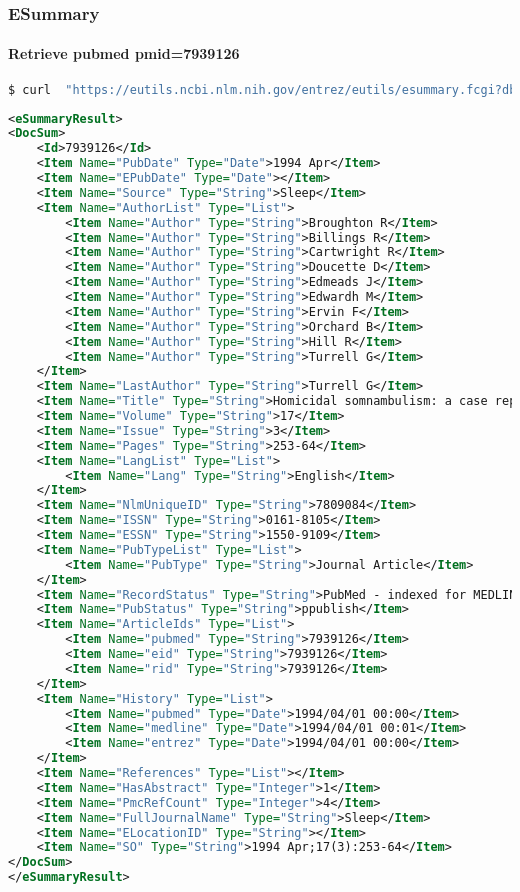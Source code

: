 \documentclass{beamer}
\begin{document}
\begin{frame}[fragile]
\frametitle{ESummary}
\framesubtitle{Retrieve pubmed pmid=7939126}
\begin{lstlisting}[language=bash,basicstyle=\tiny,breaklines=true]
$ curl  "https://eutils.ncbi.nlm.nih.gov/entrez/eutils/esummary.fcgi?db=pubmed&id=7939126"
\end{lstlisting}

\begin{lstlisting}[language=xml,basicstyle=\tiny,breaklines=false]
<eSummaryResult>
<DocSum>
	<Id>7939126</Id>
	<Item Name="PubDate" Type="Date">1994 Apr</Item>
	<Item Name="EPubDate" Type="Date"></Item>
	<Item Name="Source" Type="String">Sleep</Item>
	<Item Name="AuthorList" Type="List">
		<Item Name="Author" Type="String">Broughton R</Item>
		<Item Name="Author" Type="String">Billings R</Item>
		<Item Name="Author" Type="String">Cartwright R</Item>
		<Item Name="Author" Type="String">Doucette D</Item>
		<Item Name="Author" Type="String">Edmeads J</Item>
		<Item Name="Author" Type="String">Edwardh M</Item>
		<Item Name="Author" Type="String">Ervin F</Item>
		<Item Name="Author" Type="String">Orchard B</Item>
		<Item Name="Author" Type="String">Hill R</Item>
		<Item Name="Author" Type="String">Turrell G</Item>
	</Item>
	<Item Name="LastAuthor" Type="String">Turrell G</Item>
	<Item Name="Title" Type="String">Homicidal somnambulism: a case report.</Item>
	<Item Name="Volume" Type="String">17</Item>
	<Item Name="Issue" Type="String">3</Item>
	<Item Name="Pages" Type="String">253-64</Item>
	<Item Name="LangList" Type="List">
		<Item Name="Lang" Type="String">English</Item>
	</Item>
	<Item Name="NlmUniqueID" Type="String">7809084</Item>
	<Item Name="ISSN" Type="String">0161-8105</Item>
	<Item Name="ESSN" Type="String">1550-9109</Item>
	<Item Name="PubTypeList" Type="List">
		<Item Name="PubType" Type="String">Journal Article</Item>
	</Item>
	<Item Name="RecordStatus" Type="String">PubMed - indexed for MEDLINE</Item>
	<Item Name="PubStatus" Type="String">ppublish</Item>
	<Item Name="ArticleIds" Type="List">
		<Item Name="pubmed" Type="String">7939126</Item>
		<Item Name="eid" Type="String">7939126</Item>
		<Item Name="rid" Type="String">7939126</Item>
	</Item>
	<Item Name="History" Type="List">
		<Item Name="pubmed" Type="Date">1994/04/01 00:00</Item>
		<Item Name="medline" Type="Date">1994/04/01 00:01</Item>
		<Item Name="entrez" Type="Date">1994/04/01 00:00</Item>
	</Item>
	<Item Name="References" Type="List"></Item>
	<Item Name="HasAbstract" Type="Integer">1</Item>
	<Item Name="PmcRefCount" Type="Integer">4</Item>
	<Item Name="FullJournalName" Type="String">Sleep</Item>
	<Item Name="ELocationID" Type="String"></Item>
	<Item Name="SO" Type="String">1994 Apr;17(3):253-64</Item>
</DocSum>
</eSummaryResult>
\end{lstlisting}
\end{frame}
\end{document}
